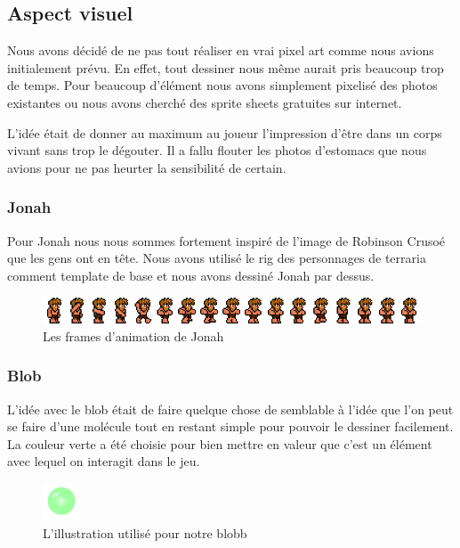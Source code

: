 \documentclass{prologArticle}
\begin{document}
\subsection{Aspect visuel}
Nous avons décidé de ne pas tout réaliser en vrai pixel art comme nous avions initialement prévu. En effet, tout dessiner nous même aurait pris beaucoup trop de temps. Pour beaucoup d'élément nous avons simplement pixelisé des photos existantes ou nous avons cherché des sprite sheets gratuites sur internet.

L'idée était de donner au maximum au joueur l'impression d'être dans un corps vivant sans trop le dégouter. Il a fallu flouter les photos d'estomacs que nous avions pour ne pas heurter la sensibilité de certain.

\subsubsection{Jonah}
Pour Jonah nous nous sommes fortement inspiré de l'image de Robinson Crusoé que les gens ont en tête. Nous avons utilisé le rig des personnages de terraria comment template de base et nous avons dessiné Jonah par dessus.

\begin{figure}[H]
    \centering
    \includegraphics[width=\textwidth]{res/jona_sheet.png}
    \caption{Les frames d'animation de Jonah}
\end{figure}

\subsubsection{Blob}
L'idée avec le blob était de faire quelque chose de semblable à l'idée que l'on peut se faire d'une molécule tout en restant simple pour pouvoir le dessiner facilement. La couleur verte a été choisie pour bien mettre en valeur que c'est un élément avec lequel on interagit dans le jeu.

\begin{figure}[H]
    \centering
    \includegraphics[width=0.1\textwidth]{res/blobb.png}
    \caption{L'illustration utilisé pour notre blobb}
\end{figure}
\end{document}

